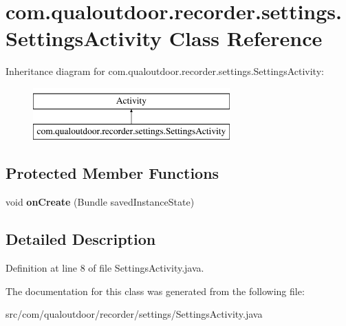 \hypertarget{classcom_1_1qualoutdoor_1_1recorder_1_1settings_1_1SettingsActivity}{\section{com.\-qualoutdoor.\-recorder.\-settings.\-Settings\-Activity Class Reference}
\label{classcom_1_1qualoutdoor_1_1recorder_1_1settings_1_1SettingsActivity}
}
Inheritance diagram for com.\-qualoutdoor.\-recorder.\-settings.\-Settings\-Activity\-:\begin{figure}[H]
\begin{center}
\leavevmode
\includegraphics[height=2.000000cm]{classcom_1_1qualoutdoor_1_1recorder_1_1settings_1_1SettingsActivity}
\end{center}
\end{figure}
\subsection*{Protected Member Functions}
\begin{DoxyCompactItemize}
\item 
\hypertarget{classcom_1_1qualoutdoor_1_1recorder_1_1settings_1_1SettingsActivity_af9a3a25e675b25b179091becbd9c3a28}{void {\bfseries on\-Create} (Bundle saved\-Instance\-State)}\label{classcom_1_1qualoutdoor_1_1recorder_1_1settings_1_1SettingsActivity_af9a3a25e675b25b179091becbd9c3a28}

\end{DoxyCompactItemize}


\subsection{Detailed Description}


Definition at line 8 of file Settings\-Activity.\-java.



The documentation for this class was generated from the following file\-:\begin{DoxyCompactItemize}
\item 
src/com/qualoutdoor/recorder/settings/Settings\-Activity.\-java\end{DoxyCompactItemize}
